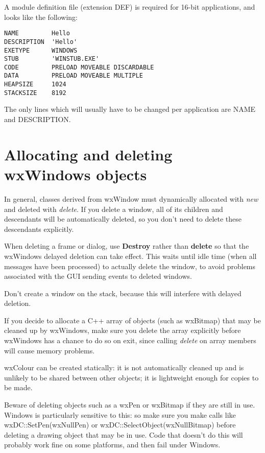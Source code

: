 A module definition file (extension DEF) is required for 16-bit applications, and
looks like the following:

\begin{verbatim}
NAME         Hello
DESCRIPTION  'Hello'
EXETYPE      WINDOWS
STUB         'WINSTUB.EXE'
CODE         PRELOAD MOVEABLE DISCARDABLE
DATA         PRELOAD MOVEABLE MULTIPLE
HEAPSIZE     1024
STACKSIZE    8192
\end{verbatim}

The only lines which will usually have to be changed per application are
NAME and DESCRIPTION.

\section{Allocating and deleting wxWindows objects}

In general, classes derived from wxWindow must dynamically allocated
with {\it new} and deleted with {\it delete}. If you delete a window,
all of its children and descendants will be automatically deleted,
so you don't need to delete these descendants explicitly.

When deleting a frame or dialog, use {\bf Destroy} rather than {\bf delete} so
that the wxWindows delayed deletion can take effect. This waits until idle time
(when all messages have been processed) to actually delete the window, to avoid
problems associated with the GUI sending events to deleted windows.

Don't create a window on the stack, because this will interfere
with delayed deletion.

If you decide to allocate a C++ array of objects (such as wxBitmap) that may
be cleaned up by wxWindows, make sure you delete the array explicitly
before wxWindows has a chance to do so on exit, since calling {\it delete} on
array members will cause memory problems.

wxColour can be created statically: it is not automatically cleaned
up and is unlikely to be shared between other objects; it is lightweight
enough for copies to be made.

Beware of deleting objects such as a wxPen or wxBitmap if they are still in use.
Windows is particularly sensitive to this: so make sure you
make calls like wxDC::SetPen(wxNullPen) or wxDC::SelectObject(wxNullBitmap) before deleting
a drawing object that may be in use. Code that doesn't do this will probably work
fine on some platforms, and then fail under Windows.

